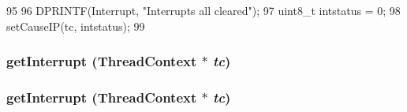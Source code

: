 \begin{DoxyCode}
95 {
96     DPRINTF(Interrupt, "Interrupts all cleared\n");
97     uint8_t intstatus = 0;
98     setCauseIP(tc, intstatus);
99 }
\end{DoxyCode}
\hypertarget{classMipsISA_1_1Interrupts_ae603c88d759977611d3bcc6e2deb61ae}{
\subsubsection[{getInterrupt}]{ getInterrupt ({\bf ThreadContext} $\ast$ {\em tc})}}
\label{classMipsISA_1_1Interrupts_ae603c88d759977611d3bcc6e2deb61ae}
\hypertarget{classMipsISA_1_1Interrupts_ae603c88d759977611d3bcc6e2deb61ae}{
\subsubsection[{getInterrupt}]{ getInterrupt ({\bf ThreadContext} $\ast$ {\em tc})}}
\label{classMipsISA_1_1Interrupts_ae603c88d759977611d3bcc6e2deb61ae}



